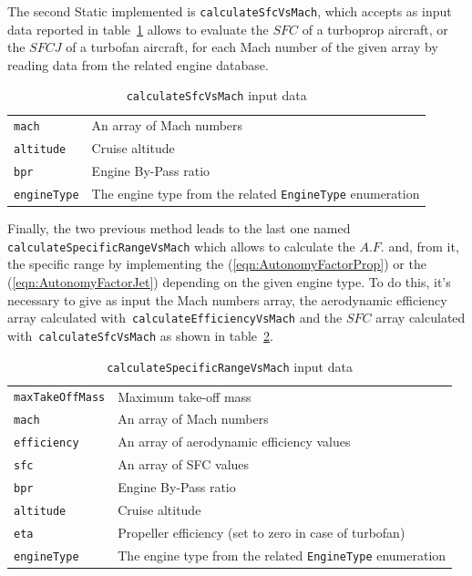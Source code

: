 \bigskip
\noindent
The second \gls{Static} implemented is \lstinline[language=Java]!calculateSfcVsMach!, which accepts as input data reported in table~\ref{table:Table2} allows to evaluate the $SFC$ of a turboprop aircraft, or the $SFCJ$ of a turbofan aircraft, for each Mach number of the given array by reading data from the related engine database.
%
\begin{table}[t]
\begin{tabular}{p{7cm}p{7.5cm}}
\toprule
\lstinline[language=Java]!mach!	& An array of Mach numbers \\[0.1cm]
\lstinline[language=Java]!altitude! & Cruise altitude \\[0.1cm]
\lstinline[language=Java]!bpr! & Engine By-Pass ratio \\[0.1cm]
\lstinline[language=Java]!engineType! & The engine type from the related \lstinline[language=Java]!EngineType! enumeration \\
\bottomrule
\end{tabular}
\caption{ \lstinline[language=Java]!calculateSfcVsMach! input data}
\label{table:Table2}
\end{table}

\bigskip
\noindent
Finally, the two previous method leads to the last one named \lstinline[language=Java]!calculateSpecificRangeVsMach! which allows to calculate the $A.F.$ and, from it, the specific range by implementing the (\ref{eqn:AutonomyFactorProp}) or the (\ref{eqn:AutonomyFactorJet}) depending on the given engine type. 
%
To do this, it's necessary to give as input the Mach numbers array, the aerodynamic efficiency array calculated with~\lstinline[language=Java]!calculateEfficiencyVsMach! and the $SFC$ array calculated with~\lstinline[language=Java]!calculateSfcVsMach! as shown in table~\ref{table:Table3}.
%
\begin{table}[!b]
\begin{tabular}{p{7cm}p{7.5cm}}
\toprule
\lstinline[language=Java]!maxTakeOffMass! & Maximum take-off mass \\[0.1	cm]
\lstinline[language=Java]!mach!	& An array of Mach numbers \\[0.1cm]
\lstinline[language=Java]!efficiency!	& An array of aerodynamic efficiency values \\[0.1cm]
\lstinline[language=Java]!sfc!	& An array of SFC values \\[0.1cm]
\lstinline[language=Java]!bpr! & Engine By-Pass ratio \\[0.1cm]
\lstinline[language=Java]!altitude! & Cruise altitude \\[0.1cm]
\lstinline[language=Java]!eta!	& Propeller efficiency (set to zero in case of turbofan) \\[0.1cm]
\lstinline[language=Java]!engineType! & The engine type from the related \lstinline[language=Java]!EngineType! enumeration \\
\bottomrule
\end{tabular}
\caption{ \lstinline[language=Java]!calculateSpecificRangeVsMach! input data}
\label{table:Table3}
\end{table}

